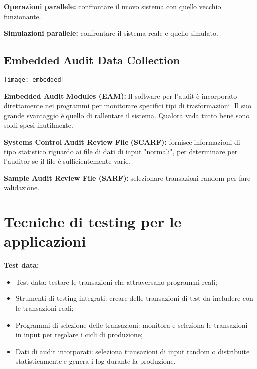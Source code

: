 \textbf{Operazioni parallele:} confrontare il nuovo sistema con quello vecchio
funzionante.

\textbf{Simulazioni parallele:} confrontare il sistema reale e quello simulato.

\subsection{Embedded Audit Data Collection}

        \begin{center}
                \texttt{[image: embedded]}
        		\label{fig:testing:embedded:audit:data:collection}
        \end{center}


\textbf{Embedded Audit Modules (EAM):} Il software per l'audit è incorporato
direttamente nei programmi per monitorare specifici tipi di trasformazioni.
Il suo grande svantaggio è quello di rallentare il sistema. Qualora vada tutto
bene sono soldi spesi inutilmente.

\textbf{Systems Control Audit Review File (SCARF):} fornisce informazioni di
tipo statistico riguardo ai file di dati di input "normali", per determinare
per l'auditor se il file è sufficientemente vario.

\textbf{Sample Audit Review File (SARF):} selezionare transazioni random per
fare validazione.

\section{Tecniche di testing per le applicazioni}

\textbf{Test data:}
\begin{itemize}
    \item Test data: testare le transazioni che attraversano programmi reali;
    \item Strumenti di testing integrati: creare delle transazioni di test da
    includere con le transazioni reali;
    \item Programmi di selezione delle transazioni: monitora e seleziona le
    transazioni in input per regolare i cicli di produzione;
    \item Dati di audit incorporati: seleziona transazioni di input random o
    distribuite statisticamente e genera i log durante la produzione.
\end{itemize}

